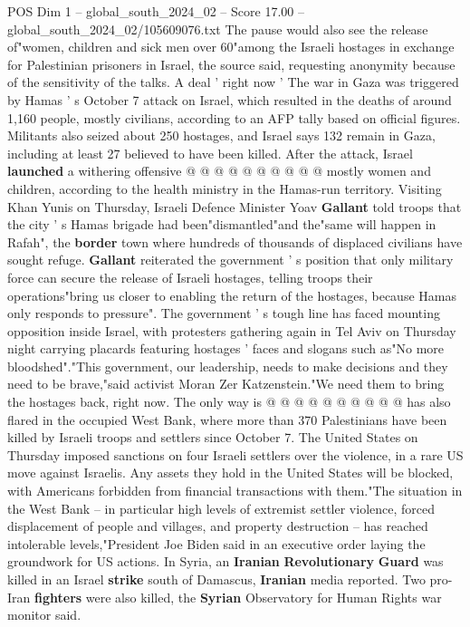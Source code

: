 \begin{textsample}{POS Dim 1 – global\_south\_2024\_02 – Score 17.00 – global\_south\_2024\_02/105609076.txt}
The pause would also see the release of"women, children and sick men over 60"among the Israeli hostages in exchange for Palestinian prisoners in Israel, the source said, requesting anonymity because of the sensitivity of the talks.
A deal ' right now ' The war in Gaza was triggered by Hamas ' s October 7 attack on Israel, which resulted in the deaths of around 1,160 people, mostly civilians, according to an AFP tally based on official figures.
Militants also seized about 250 hostages, and Israel says 132 remain in Gaza, including at least 27 believed to have been killed.
After the attack, Israel \textbf{launched} a withering offensive @ @ @ @ @ @ @ @ @ @ mostly women and children, according to the health ministry in the Hamas-run territory.
Visiting Khan Yunis on Thursday, Israeli Defence Minister Yoav \textbf{Gallant} told troops that the city ' s Hamas brigade had been"dismantled"and the"same will happen in Rafah", the \textbf{border} town where hundreds of thousands of displaced civilians have sought refuge. \textbf{Gallant} reiterated the government ' s position that only military force can secure the release of Israeli hostages, telling troops their operations"bring us closer to enabling the return of the hostages, because Hamas only responds to pressure".
The government ' s tough line has faced mounting opposition inside Israel, with protesters gathering again in Tel Aviv on Thursday night carrying placards featuring hostages ' faces and slogans such as"No more bloodshed"."This government, our leadership, needs to make decisions and they need to be brave,"said activist Moran Zer Katzenstein."We need them to bring the hostages back, right now.
The only way is @ @ @ @ @ @ @ @ @ @ has also flared in the occupied West Bank, where more than 370 Palestinians have been killed by Israeli troops and settlers since October 7.
The United States on Thursday imposed sanctions on four Israeli settlers over the violence, in a rare US move against Israelis.
Any assets they hold in the United States will be blocked, with Americans forbidden from financial transactions with them."The situation in the West Bank -- in particular high levels of extremist settler violence, forced displacement of people and villages, and property destruction -- has reached intolerable levels,"President Joe Biden said in an executive order laying the groundwork for US actions.
In Syria, an \textbf{Iranian} \textbf{Revolutionary} \textbf{Guard} was killed in an Israel \textbf{strike} south of Damascus, \textbf{Iranian} media reported.
Two pro-Iran \textbf{fighters} were also killed, the \textbf{Syrian} Observatory for Human Rights war monitor said.

\end{textsample}
